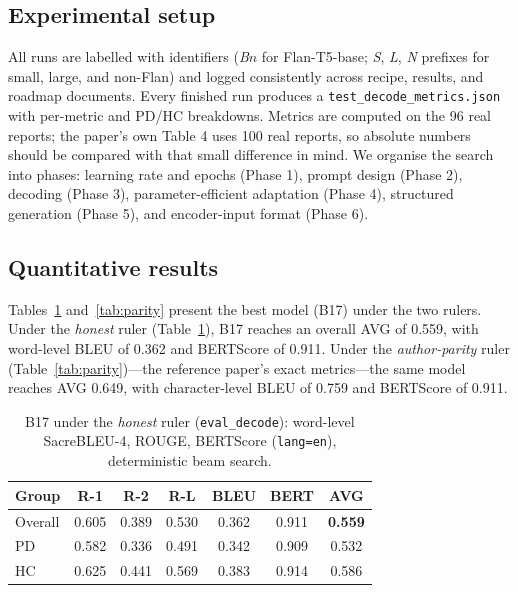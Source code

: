 \documentclass[11pt,twocolumn]{article}
\newcommand{\bt}[1]{\texttt{#1}}
\begin{document}
\subsection{Experimental setup}
All runs are labelled with identifiers (\emph{B}$n$ for Flan-T5-base; \emph{S}, \emph{L},
\emph{N} prefixes for small, large, and non-Flan) and logged consistently across recipe, results,
and roadmap documents. Every finished run produces a \bt{test\_decode\_metrics.json} with
per-metric and PD/HC breakdowns. Metrics are computed on the 96 real reports; the paper's own
Table 4 uses 100 real reports, so absolute numbers should be compared with that small difference
in mind. We organise the search into phases: learning rate and epochs (Phase 1), prompt design
(Phase 2), decoding (Phase 3), parameter-efficient adaptation (Phase 4), structured generation
(Phase 5), and encoder-input format (Phase 6).

\subsection{Quantitative results}
Tables~\ref{tab:honest} and~\ref{tab:parity} present the best model (B17) under the two rulers.
Under the \emph{honest} ruler (Table~\ref{tab:honest}), B17 reaches an overall AVG of 0.559, with
word-level BLEU of 0.362 and BERTScore of 0.911. Under the \emph{author-parity} ruler
(Table~\ref{tab:parity})---the reference paper's exact metrics---the same model reaches AVG 0.649,
with character-level BLEU of 0.759 and BERTScore of 0.911.

\begin{table}[t]
\centering
\caption{B17 under the \emph{honest} ruler (\bt{eval\_decode}): word-level SacreBLEU-4, ROUGE,
BERTScore (\bt{lang=en}), deterministic beam search.}
\label{tab:honest}
\small
\begin{tabular}{lcccccc}
\toprule
Group & R-1 & R-2 & R-L & BLEU & BERT & AVG \\
\midrule
Overall & 0.605 & 0.389 & 0.530 & 0.362 & 0.911 & \textbf{0.559} \\
PD      & 0.582 & 0.336 & 0.491 & 0.342 & 0.909 & 0.532 \\
HC      & 0.625 & 0.441 & 0.569 & 0.383 & 0.914 & 0.586 \\
\bottomrule
\end{tabular}
\end{table}
\end{document}
